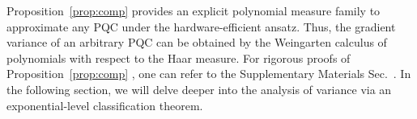 \documentclass[%
 superscriptaddress,
 aps,prl,
 reprint,
 twocolumn,
 amsmath,amssymb,showpacs,
 bibnotes,
]{revtex4-2}
\newcommand{\RomanNumeralCaps}[1]
    {\MakeUppercase{\romannumeral #1}}
\newcommand*{\dif}{\mathop{}\!\mathrm{d}}
\begin{document}
Proposition~\ref{prop:comp} provides an explicit polynomial measure family to approximate any PQC under the hardware-efficient ansatz. Thus, the gradient variance of an arbitrary PQC can be obtained by the Weingarten calculus of polynomials with respect to the Haar measure. For rigorous proofs of Proposition~\ref{prop:comp} , one can refer to the Supplementary Materials Sec.~\RomanNumeralCaps{3}.
In the following section, we will delve deeper into the analysis of variance via an exponential-level classification theorem.


\end{document}
